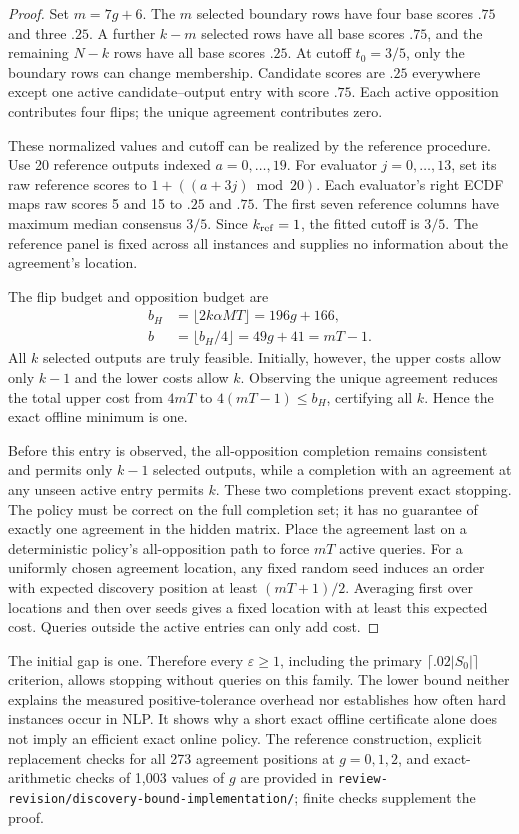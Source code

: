 \begin{proof}
Set $m=7g+6$. The $m$ selected boundary rows have four base scores $.75$ and three $.25$. A further $k-m$ selected rows have all base scores $.75$, and the remaining $N-k$ rows have all base scores $.25$. At cutoff $t_0=3/5$, only the boundary rows can change membership. Candidate scores are $.25$ everywhere except one active candidate--output entry with score $.75$. Each active opposition contributes four flips; the unique agreement contributes zero.

These normalized values and cutoff can be realized by the reference procedure. Use 20 reference outputs indexed $a=0,\ldots,19$. For evaluator $j=0,\ldots,13$, set its raw reference scores to $1+((a+3j)\bmod20)$. Each evaluator's right ECDF maps raw scores 5 and 15 to $.25$ and $.75$. The first seven reference columns have maximum median consensus $3/5$. Since $k_{\rm ref}=1$, the fitted cutoff is $3/5$. The reference panel is fixed across all instances and supplies no information about the agreement's location.

The flip budget and opposition budget are
\[
 \begin{aligned}
 b_H&=\lfloor2k\alpha MT\rfloor=196g+166,\\
 b&=\lfloor b_H/4\rfloor=49g+41=mT-1.
 \end{aligned}
\]
All $k$ selected outputs are truly feasible. Initially, however, the upper costs allow only $k-1$ and the lower costs allow $k$. Observing the unique agreement reduces the total upper cost from $4mT$ to $4(mT-1)\le b_H$, certifying all $k$. Hence the exact offline minimum is one.

Before this entry is observed, the all-opposition completion remains consistent and permits only $k-1$ selected outputs, while a completion with an agreement at any unseen active entry permits $k$. These two completions prevent exact stopping. The policy must be correct on the full completion set; it has no guarantee of exactly one agreement in the hidden matrix. Place the agreement last on a deterministic policy's all-opposition path to force $mT$ active queries. For a uniformly chosen agreement location, any fixed random seed induces an order with expected discovery position at least $(mT+1)/2$. Averaging first over locations and then over seeds gives a fixed location with at least this expected cost. Queries outside the active entries can only add cost.
\end{proof}

The initial gap is one. Therefore every $\varepsilon\ge1$, including the primary $\lceil .02|S_0|\rceil$ criterion, allows stopping without queries on this family. The lower bound neither explains the measured positive-tolerance overhead nor establishes how often hard instances occur in NLP. It shows why a short exact offline certificate alone does not imply an efficient exact online policy. The reference construction, explicit replacement checks for all 273 agreement positions at $g=0,1,2$, and exact-arithmetic checks of 1,003 values of $g$ are provided in \nolinkurl{review-revision/discovery-bound-implementation/}; finite checks supplement the proof.

